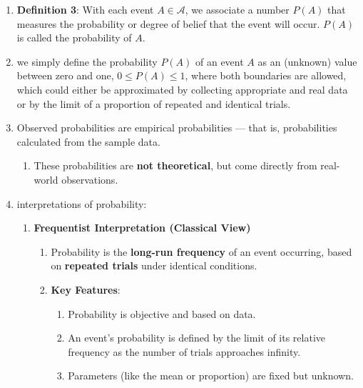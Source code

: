 \begin{enumerate}
    \item \textbf{Definition 3}: With each event $A \in \mathcal{A}$, we associate a number $P (A)$ that measures the probability or degree of belief that the event will occur.
    $P (A)$ is called the probability of $A$.
    \hfill \cite{mfml/book/mml/Deisenroth-Faisal-Ong}

    \item we simply define the probability $P(A)$ of an event $A$ as an (unknown) value between zero and one, $0 \leq P (A) \leq 1$, where both boundaries are allowed, which could either be approximated by collecting appropriate and real data or by the limit of a proportion of repeated and identical trials.
    \hfill \cite{statistics/book/Statistics-for-Data-Scientists/Maurits-Kaptein}

    \item
    \begin{definition}
        Observed probabilities are empirical probabilities — that is, probabilities calculated from the sample data.
    \end{definition}
    \begin{enumerate}
        \item These probabilities are \textbf{not theoretical}, but come directly from real-world observations.
    \end{enumerate}

    \item interpretations of probability:
    \begin{enumerate}
        \item \textbf{Frequentist Interpretation (Classical View)}
        \begin{enumerate}
            \item Probability is the \textbf{long-run frequency} of an event occurring, based on \textbf{repeated trials} under identical conditions.

            \item \textbf{Key Features}:
            \begin{enumerate}
                \item Probability is objective and based on data.

                \item An event's probability is defined by the limit of its relative frequency as the number of trials approaches infinity.

                \item Parameters (like the mean or proportion) are fixed but unknown.


\end{enumerate}
\end{enumerate}
\end{enumerate}
\end{enumerate}
